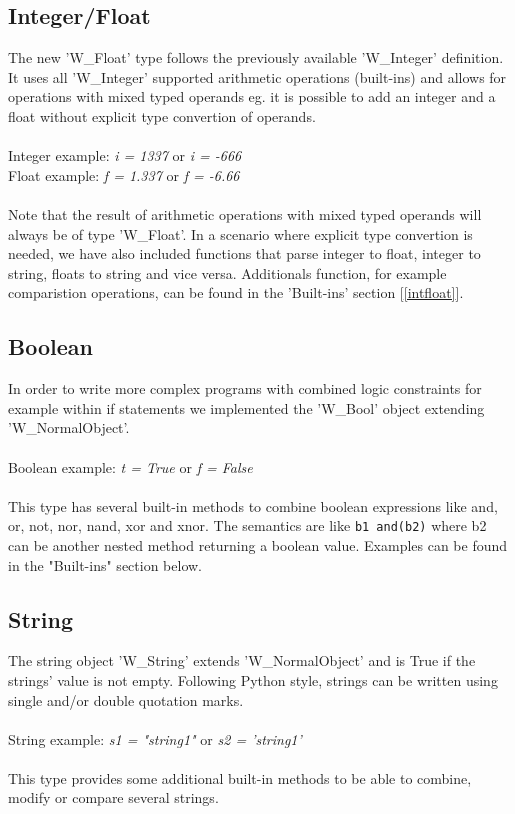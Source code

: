 \documentclass{article}
\begin{document}
\subsection{Integer/Float}
The new 'W\_Float' type follows the previously available 'W\_Integer' definition. It uses all 'W\_Integer' supported arithmetic operations (built-ins) and allows for operations with mixed typed operands eg. it is possible to add an integer and a float without explicit type convertion of operands. \\
\\ Integer example: \textit{i = 1337} or \textit{i = -666} 
\\ Float example: \textit{f = 1.337} or \textit{f = -6.66} \\\\
Note that the result of arithmetic operations with mixed typed operands will always be of type 'W\_Float'. In a scenario where explicit type convertion is needed, we have also included functions that parse integer to float, integer to string, floats to string and vice versa. Additionals function, for example comparistion operations, can be found in the 'Built-ins' section [\ref{intfloat}].

\subsection{Boolean}
In order to write more complex programs with combined logic constraints for example within if statements we implemented the 'W\_Bool' object extending 'W\_NormalObject'.\\
\\ Boolean example: \textit{t = True} or \textit{f = False} \\\\
This type has several built-in methods to combine boolean expressions like and, or, not, nor, nand, xor and xnor.
The semantics are like \texttt{b1 and(b2)} where b2 can be another nested method returning a boolean value. Examples can be found in the "Built-ins" section below.


\subsection{String}
The string object 'W\_String' extends 'W\_NormalObject' and is True if the strings' value is not empty. Following Python style, strings can be written using single and/or double quotation marks.\\
\\ String example: \textit{s1 = "string1"} or \textit{s2 = 'string1'} \\\\
This type provides some additional built-in methods to be able to combine, modify or compare several strings.
\end{document}
